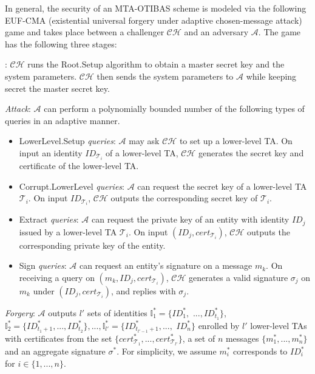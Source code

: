 \documentclass[10pt,journal,compsoc]{IEEEtran}
\begin{document}
In general, the security of an MTA-OTIBAS scheme is modeled via the following EUF-CMA (existential
universal forgery under adaptive chosen-message attack) game
\cite{Gentry} and takes place between a challenger $\mathcal {CH}$
and an adversary $\mathcal {A}$. The game has the following three
stages:

\smallskip
{}: $\mathcal {CH}$ runs the {\sf Root.Setup}
algorithm to obtain a master secret key and the system parameters.
$\mathcal {CH}$ then sends the system parameters to $\mathcal {A}$
while keeping secret the master secret key.

\medskip
\noindent \emph{Attack}: $\mathcal {A}$ can perform a polynomially
bounded number of the following types of queries in an adaptive
manner.
\begin{itemize}
  \item {\sf LowerLevel.Setup} \emph{queries}: $\mathcal {A}$ may
  ask $\mathcal {CH}$ to set up a lower-level TA. On input an
  identity $ID_{\mathcal{T}_i}$ of a lower-level TA,
    $\mathcal {CH}$ generates the secret key and certificate of the lower-level TA.

  \item {\sf Corrupt.LowerLevel} \emph{queries}: $\mathcal {A}$ can request the
    secret key of a lower-level TA $\mathcal{T}_i$. On input
    $ID_{\mathcal{T}_i}$,
    $\mathcal {CH}$
    outputs the corresponding secret key of $\mathcal{T}_i$.

  \item {\sf Extract} \emph{queries}: $\mathcal {A}$ can request the
    private key of an entity with identity $ID_j$ issued by a lower-level TA $\mathcal{T}_i$.
    On input $(ID_j,cert_{\mathcal{T}_i})$,
    $\mathcal {CH}$
    outputs the corresponding private key of the entity.

  \item {\sf Sign} \emph{queries}: $\mathcal {A}$ can
    request an entity's signature on a message $m_k$.
    On receiving a query on $(m_k, ID_j,cert_{\mathcal{T}_i})$,
    $\mathcal {CH}$ generates a valid
    signature $\sigma_j$ on $m_k$ under $(ID_j,cert_{\mathcal{T}_i})$,
    and replies with $\sigma_j$.
\end{itemize}

\noindent \emph{Forgery}: $\mathcal {A}$ outputs $l'$ sets of
identities $\mathbb{I}_1^*=\{ID_1^*,$ $...,ID_{t_1}^*\}$,
$\mathbb{I}_2^*=\{ID_{t_1+1}^*,...,ID_{t_2}^*\}
,...,\mathbb{I}_{l'}^*=\{ID_{t_{l'-1}+1}^*,...,$ $ID_n^*\}$ enrolled by
$l'$ lower-level TAs with certificates from the set
$\{cert_{\mathcal{T}_1}^*,...,cert_{\mathcal{T}_{l'}}^*\}$, a set of
$n$ messages $\{m_1^*,...,m_n^*\}$ and an aggregate signature
$\sigma^*$. For simplicity, we assume $m_i^*$ corresponds to
$ID_i^*$ for $i\in \{1,...,n\}$.
\end{document}
